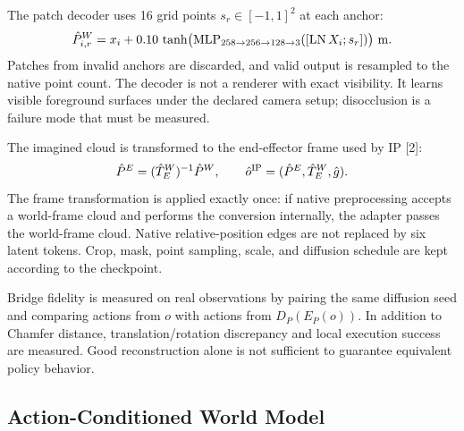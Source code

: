 \documentclass[
  10pt,
]{article}
\begin{document}
The patch decoder uses 16 grid points \(s_r\in[-1,1]^2\) at each anchor:
\begin{equation}\label{eq:decoder}
\hat P_{i,r}^W=x_i+
0.10\,\tanh\bigl(\operatorname{MLP}_{258\to256\to128\to3}([\operatorname{LN}X_i;s_r])\bigr)\ {\rm m}.
\end{equation}
Patches from invalid anchors are discarded, and valid output is resampled to the native point count. The decoder is not a renderer with exact visibility. It learns visible foreground surfaces under the declared camera setup; disocclusion is a failure mode that must be measured.

The imagined cloud is transformed to the end-effector frame used by IP {[}2{]}:
\begin{equation}\label{eq:observationbridge}
\hat P^E=(\hat T_E^W)^{-1}\hat P^W,\qquad
\hat o^{\rm IP}=(\hat P^E,\hat T_E^W,\hat g).
\end{equation}
The frame transformation is applied exactly once: if native preprocessing accepts a world-frame cloud and performs the conversion internally, the adapter passes the world-frame cloud. Native relative-position edges are not replaced by six latent tokens. Crop, mask, point sampling, scale, and diffusion schedule are kept according to the checkpoint.

Bridge fidelity is measured on real observations by pairing the same diffusion seed and comparing actions from \(o\) with actions from \(D_P(E_P(o))\). In addition to Chamfer distance, translation/rotation discrepancy and local execution success are measured. Good reconstruction alone is not sufficient to guarantee equivalent policy behavior.

\hypertarget{world-model-huxe0nh-ux111ux1ed9ng-cuxf3-ux111iux1ec1u-kiux1ec7n}{%
\subsection{Action-Conditioned World Model}\label{world-model-huxe0nh-ux111ux1ed9ng-cuxf3-ux111iux1ec1u-kiux1ec7n}}
\end{document}
